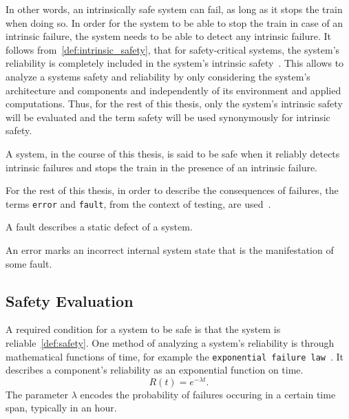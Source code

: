 In other words, an intrinsically safe system can fail, as long as it stops the train when doing so.
In order for the system to be able to stop the train in case of an intrinsic failure, the system needs to be able to detect any intrinsic failure.
It follows from~\autoref{def:intrinsic_safety}, that for safety-critical systems, the system's reliability is completely included in the system's intrinsic safety~\cite{BoulangerStandards}.
This allows to analyze a systems safety and reliability by only considering the system's architecture and components and independently of its environment and applied computations.
Thus, for the rest of this thesis, only the system's intrinsic safety will be evaluated and the term safety will be used synonymously for intrinsic safety.
\begin{definition}
A system, in the course of this thesis, is said to be safe when it reliably detects intrinsic failures and stops the train in the presence of an intrinsic failure.
\label{def:safety}
\end{definition}

For the rest of this thesis, in order to describe the consequences of failures, the terms \texttt{error} and \texttt{fault}, from the context of testing, are used~\cite{AmmannOffutt2016}.

\begin{definition}
A fault describes a static defect of a system.
\end{definition}

\begin{definition}
An error marks an incorrect internal system state that is the manifestation of some fault.
\end{definition}

\subsection{Safety Evaluation}
A required condition for a system to be safe is that the system is reliable~\autoref{def:safety}.
One method of analyzing a system's reliability is through mathematical functions of time, for example the \texttt{exponential failure law}~\cite{GeffroyMotetDependableComputing}.
It describes a component's reliability as an exponential function on time.
\begin{equation}
R(t) = e^{-\lambda t}.
\label{eq:expFailureLaw}
\end{equation}
The parameter $\lambda$ encodes the probability of failures occuring in a certain time span, typically in an hour.


